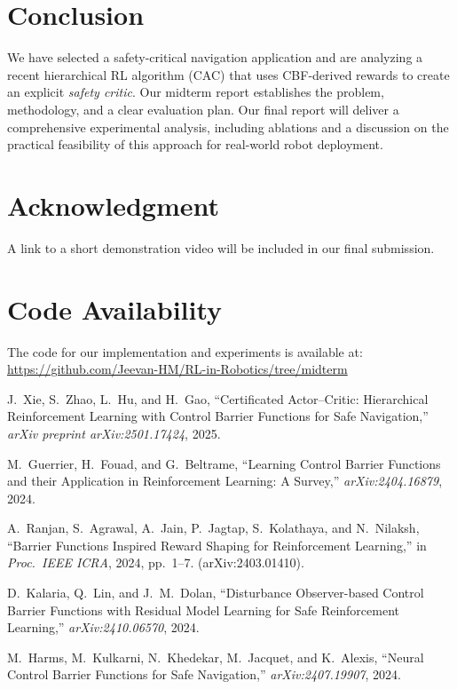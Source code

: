 \documentclass[10pt,conference]{IEEEtran}
\begin{document}
\section{Conclusion}
We have selected a safety-critical navigation application and are analyzing a recent hierarchical RL algorithm (CAC) that uses CBF-derived rewards to create an explicit \emph{safety critic}. Our midterm report establishes the problem, methodology, and a clear evaluation plan. Our final report will deliver a comprehensive experimental analysis, including ablations and a discussion on the practical feasibility of this approach for real-world robot deployment.

\section*{Acknowledgment}
A link to a short demonstration video will be included in our final submission.

\section*{Code Availability}
The code for our implementation and experiments is available at: \url{https://github.com/Jeevan-HM/RL-in-Robotics/tree/midterm}


\begin{thebibliography}{99}

J.~Xie, S.~Zhao, L.~Hu, and H.~Gao, ``Certificated Actor--Critic: Hierarchical Reinforcement Learning with Control Barrier Functions for Safe Navigation,'' \emph{arXiv preprint arXiv:2501.17424}, 2025.

M.~Guerrier, H.~Fouad, and G.~Beltrame, ``Learning Control Barrier Functions and their Application in Reinforcement Learning: A Survey,'' \emph{arXiv:2404.16879}, 2024.

A.~Ranjan, S.~Agrawal, A.~Jain, P.~Jagtap, S.~Kolathaya, and N.~Nilaksh, ``Barrier Functions Inspired Reward Shaping for Reinforcement Learning,'' in \emph{Proc.\ IEEE ICRA}, 2024, pp.~1--7. (arXiv:2403.01410).

D.~Kalaria, Q.~Lin, and J.~M.~Dolan, ``Disturbance Observer-based Control Barrier Functions with Residual Model Learning for Safe Reinforcement Learning,'' \emph{arXiv:2410.06570}, 2024.

M.~Harms, M.~Kulkarni, N.~Khedekar, M.~Jacquet, and K.~Alexis, ``Neural Control Barrier Functions for Safe Navigation,'' \emph{arXiv:2407.19907}, 2024.

\end{thebibliography}
\end{document}
